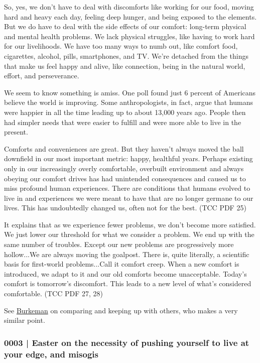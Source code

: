 			So, yes, we don't have to deal with discomforts like working for our food, moving hard and heavy each day, feeling deep hunger, and being exposed to the elements. But we do have to deal with the side effects of our comfort: long-term physical and mental health problems. We lack physical struggles, like having to work hard for our livelihoods. We have too many ways to numb out, like comfort food, cigarettes, alcohol, pills, smartphones, and TV. We're detached from the things that make us feel happy and alive, like connection, being in the natural world, effort, and perseverance. 

			We seem to know something is amiss. One poll found just 6 percent of Americans believe the world is improving. Some anthropologists, in fact, argue that humans were happier in all the time leading up to about 13,000 years ago. People then had simpler needs that were easier to fulfill and were more able to live in the present. 

			Comforts and conveniences are great. But they haven't always moved the ball downfield in our most important metric: happy, healthful years. Perhaps existing only in our increasingly overly comfortable, overbuilt environment and always obeying our comfort drives has had unintended consequences and caused us to miss profound human experiences. There are conditions that humans evolved to live in and experiences we were meant to have that are no longer germane to our lives. This has undoubtedly changed us, often not for the best. (TCC PDF 25)
			
			It explains that as we experience fewer problems, we don't become more satisfied. We just lower our threshold for what we consider a problem. We end up with the same number of troubles. Except our new problems are progressively more hollow...We are always moving the goalpost. There is, quite literally, a scientific basis for first-world problems...Call it comfort creep. When a new comfort is introduced, we adapt to it and our old comforts become unacceptable. Today's comfort is tomorrow's discomfort. This leads to a new level of what's considered comfortable. (TCC PDF 27, 28)
				\begin{compactitem}
					\item See \hyperref[GM-LIFE-ENERGY-0005]{Burkeman} on comparing and keeping up with others, who makes a very similar point.
				\end{compactitem}
				
		\subsubsection{0003 | Easter on the necessity of pushing yourself to live at your edge, and misogis}
			\label{GM-LIFE-GROWTH-0003}
			
